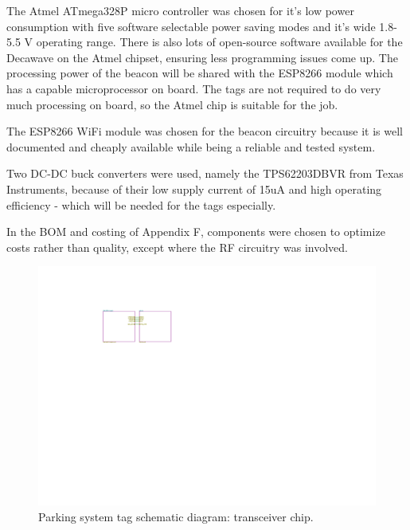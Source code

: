 \newpage
{}
The Atmel ATmega328P micro controller was chosen for it's low power consumption with five software selectable power saving modes and it's wide 1.8-5.5 V operating range.\cite{atmel} There is also lots of open-source software available for the Decawave on the Atmel chipset, ensuring less programming issues come up. The processing power of the beacon will be shared with the ESP8266 module which has a capable microprocessor on board. The tags are not required to do very much processing on board, so the Atmel chip is suitable for the job.

The ESP8266 WiFi module was chosen for the beacon circuitry because it is well documented and cheaply available while being a reliable and tested system.

Two DC-DC buck converters were used, namely the TPS62203DBVR from Texas Instruments, because of their low supply current of 15uA and high operating efficiency - which will be needed for the tags especially.

In the BOM and costing of Appendix F, components were chosen to optimize costs rather than quality, except where the RF circuitry was involved.

\begin{figure}[H]
\begin{center}
\includegraphics[page=2,scale=0.5,trim={0cm 0cm 0cm 0cm},clip]{data/parking-system.pdf}
\caption{Parking system tag schematic diagram: transceiver chip.\cite{DW-data}}
\end{center}
\end{figure}

